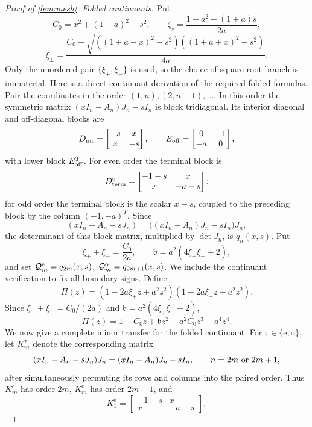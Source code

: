 \documentclass[review,hidelinks,onefignum,onetabnum]{siamart251216}
\begin{document}
\begin{proof}[Proof of \cref{lem:mesh}]
\medskip\noindent\emph{Folded continuants.}\quad
Put
\[
 C_0=x^2+(1-a)^2-s^2,\qquad
 \zeta_s=\frac{1+a^2+(1+a)s}{2a},
\]
\[
 \xi_\pm=\frac{C_0\pm
 \sqrt{((1+a-x)^2-s^2)((1+a+x)^2-s^2)}}{4a}.
\]
Only the unordered pair \(\{\xi_+,\xi_-\}\) is used, so the choice of
square-root branch is immaterial.
Here is a direct continuant derivation of the required folded formulas.
Pair the coordinates in the order
\((1,n),(2,n-1),\ldots\).  In this order the symmetric matrix
\((xI_n-A_n)J_n-sI_n\) is block tridiagonal.  Its interior diagonal and
off-diagonal blocks are
\[
 D_{\rm int}=\begin{bmatrix}-s&x\\x&-s\end{bmatrix},
 \qquad
 E_{\rm off}=\begin{bmatrix}0&-1\\-a&0\end{bmatrix},
\]
with lower block \(E_{\rm off}^T\).  For even order the terminal block is
\[
 D_{\rm term}^{\rm e}=\begin{bmatrix}-1-s&x\\x&-a-s\end{bmatrix};
\]
for odd order the terminal block is the scalar \(x-s\), coupled to the
preceding block by the column \((-1,-a)^T\).  Since
\[
 (xI_n-A_n-sJ_n)=\bigl((xI_n-A_n)J_n-sI_n\bigr)J_n,
\]
the determinant of this block matrix, multiplied by \(\det J_n\), is
\(q_n(x,s)\).  Put
\[
 \xi_++\xi_-=\frac{C_0}{2a},\qquad
 \mathfrak b=a^2(4\xi_+\xi_-+2),
\]
and set \(\mathcal Q_m^{\rm e}=q_{2m}(x,s)\),
\(\mathcal Q_m^{\rm o}=q_{2m+1}(x,s)\).  We include the continuant
verification to fix all boundary signs.  Define
\[
 \Pi(z)=(1-2a\xi_+z+a^2z^2)(1-2a\xi_-z+a^2z^2).
\]
Since \(\xi_++\xi_-=C_0/(2a)\) and
\(\mathfrak b=a^2(4\xi_+\xi_-+2)\),
\begin{equation}\label{eq:fold-characteristic}
 \Pi(z)=1-C_0z+\mathfrak b z^2-a^2C_0z^3+a^4z^4.
\end{equation}
We now give a complete minor transfer for the folded continuant.
For \(\tau\in\{\mathrm e,\mathrm o\}\), let \(K_m^\tau\) denote the
corresponding matrix
\[
 (xI_n-A_n-sJ_n)J_n=(xI_n-A_n)J_n-sI_n,
 \qquad n=2m\ \hbox{or}\ 2m+1,
\]
after simultaneously permuting its rows and columns into the paired
order.  Thus \(K_m^{\mathrm e}\) has order \(2m\),
\(K_m^{\mathrm o}\) has order \(2m+1\), and
\[
 K_1^{\mathrm e}=
 \begin{bmatrix}-1-s&x\\x&-a-s\end{bmatrix},
\]
\end{proof}
\end{document}

